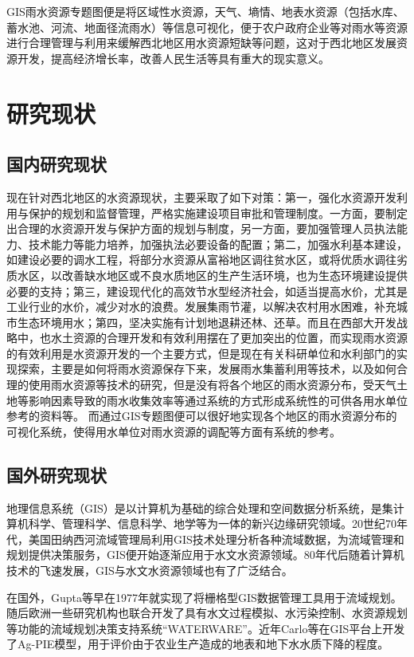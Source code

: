 GIS雨水资源专题图便是将区域性水资源，天气、墒情、地表水资源（包括水库、蓄水池、河流、地面径流雨水）等信息可视化，便于农户政府企业等对雨水等资源进行合理管理与利用来缓解西北地区用水资源短缺等问题，这对于西北地区发展资源开发，提高经济增长率，改善人民生活等具有重大的现实意义。\cite{刘治华-5}


\section{研究现状}
\subsection{国内研究现状}

现在针对西北地区的水资源现状，主要采取了如下对策：第一，强化水资源开发利用与保护的规划和监督管理，严格实施建设项目审批和管理制度。一方面，要制定出合理的水资源开发与保护方面的规划与制度，另一方面，要加强管理人员执法能力、技术能力等能力培养，加强执法必要设备的配置；第二，加强水利基本建设，如建设必要的调水工程，将部分水资源从富裕地区调往贫水区，或将优质水调往劣质水区，以改善缺水地区或不良水质地区的生产生活环境，也为生态环境建设提供必要的支持；第三，建设现代化的高效节水型经济社会，如适当提高水价，尤其是工业行业的水价，减少对水的浪费。发展集雨节灌，以解决农村用水困难，补充城市生态环境用水；第四，坚决实施有计划地退耕还林、还草。而且在西部大开发战略中，也水土资源的合理开发和有效利用摆在了更加突出的位置，而实现雨水资源的有效利用是水资源开发的一个主要方式，但是现在有关科研单位和水利部门的实现探索，主要是如何将雨水资源保存下来，发展雨水集蓄利用等技术，以及如何合理的使用雨水资源等技术的研究，但是没有将各个地区的雨水资源分布，受天气土地等影响因素导致的雨水收集效率等通过系统的方式形成系统性的可供各用水单位参考的资料等。
而通过GIS专题图便可以很好地实现各个地区的雨水资源分布的可视化系统，使得用水单位对雨水资源的调配等方面有系统的参考。

\subsection{国外研究现状}
地理信息系统（GIS）是以计算机为基础的综合处理和空间数据分析系统，是集计算机科学、管理科学、信息科学、地学等为一体的新兴边缘研究领域。20世纪70年代，美国田纳西河流域管理局利用GIS技术处理分析各种流域数据，为流域管理和规划提供决策服务，GIS便开始逐渐应用于水文水资源领域。80年代后随着计算机技术的飞速发展，GIS与水文水资源领域也有了广泛结合。

在国外，Gupta等早在1977年就实现了将栅格型GIS数据管理工具用于流域规划。随后欧洲一些研究机构也联合开发了具有水文过程模拟、水污染控制、水资源规划等功能的流域规划决策支持系统“WATERWARE”。近年Carlo等在GIS平台上开发了Ag-PIE模型，用于评价由于农业生产造成的地表和地下水水质下降的程度。

